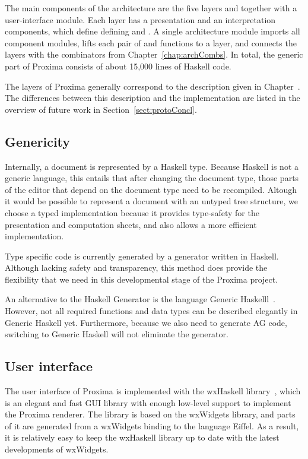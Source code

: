 
The main components of the architecture are the five layers and together with a user-interface module. 
Each layer has a presentation and an interpretation components, which define defining  and . A single architecture module imports all component modules, lifts each pair of  and  functions to a layer, and connects the layers with the combinators from Chapter~\ref{chap:archCombs}.  In total, the generic part of Proxima consists of about 15,000 lines of Haskell code. 

The layers of Proxima generally correspond to the description given in Chapter~. The differences between this description and the implementation are listed in the overview of future work in  Section~\ref{sect:protoConcl}.

\subsection{Genericity}

Internally, a document is represented by a Haskell type. Because Haskell is not a generic language, this entails that after changing the document type, those parts of the editor that depend on the document type need to be recompiled. Altough it would be possible to represent a document with an untyped tree structure, we choose a typed implementation because it provides type-safety for the presentation and computation sheets, and also allows a more efficient implementation.

Type specific code is currently generated by a generator written in Haskell. Although lacking safety and transparency, this method does provide the flexibility that we need in this developmental stage of the Proxima project. 

An alternative to the Haskell Generator is the language Generic Haskelll~\cite{clarke02genericHaskell}. However, not all required functions and data types can be described elegantly in Generic Haskell yet. Furthermore, because we also need to generate AG code, switching to Generic Haskell will not eliminate the generator.


\subsection{User interface}

The user interface of Proxima is implemented with the wxHaskell library~\cite{leijen04wxHaskell}, which is  an elegant and fast GUI library with enough low-level support to implement the Proxima renderer. The library is based on the wxWidgets library, and parts of it are generated from a wxWidgets binding to the language Eiffel. As a result, it is relatively easy to keep the wxHaskell library up to date with the latest developments of wxWidgets. 


